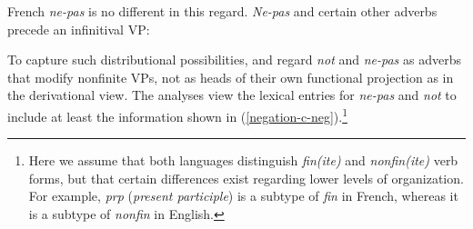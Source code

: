\documentclass[output=paper
                ,modfonts
                ,nonflat
	        ,collection
	        ,collectionchapter
	        ,collectiontoclongg
 	        ,biblatex
                ,babelshorthands
                ,newtxmath
                ,draftmode
                ,colorlinks, citecolor=brown
]{./langsci/langscibook}
\begin{document}
{\begin{exe}
\begin{xlist}
\begin{exe}
\begin{xlist}
\eal\label{negation-31}
\zl

\noindent
French \textit{ne-pas} is no different in this regard.  \textit{Ne-pas} and
certain other adverbs precede an infinitival VP:

\eal
{}
\zl

To capture such distributional possibilities, \citet{Kim:00} and \citet{KS:02} regard \textit{not} and \textit{ne-pas} as adverbs that modify
nonfinite VPs, not as  heads of their own functional projection as in the derivational view. The
analyses view the lexical entries for \textit{ne-pas} and \textit{not} to include at
least the
information shown in (\ref{negation-c-neg}).\footnote{Here we assume that both languages
distinguish \textit{fin(ite)} and \textit{nonfin(ite)} verb forms, but that
certain differences exist regarding lower levels of organization. For example,
\textit{prp} (\textit{present participle}) is a subtype of \textit{fin} in French,
whereas it is a subtype of \textit{nonfin} in English.}

%


\end{xlist}
\end{exe}
\end{xlist}
\end{exe}}
\end{document}
